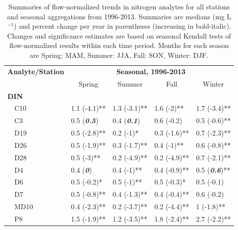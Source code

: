 \documentclass[journal = esthag, manuscript = article]{achemso}\usepackage[]{graphicx}\usepackage[]{color}
\begin{document}
\begin{suppinfo}
\begin{table}[!tbp]
\caption{Summaries of flow-normalized trends in nitrogen analytes for all stations and seasonal aggregations from 1996-2013. Summaries are  medians (mg L$^{-1}$) and percent change per year in parentheses (increasing in bold-italic). Changes and significance estimates are based on seasonal Kendall tests of flow-normalized results within each time period. Months for each season are Spring: MAM, Summer: JJA, Fall: SON, Winter: DJF.\label{tab:trndsaft}} 
\begin{center}
\begin{tabular}{lllll}
\hline\hline
\multicolumn{1}{l}{\bfseries Analyte/Station}&\multicolumn{4}{c}{\bfseries Seasonal, 1996-2013}\tabularnewline
\cline{2-5}
\multicolumn{1}{l}{}&\multicolumn{1}{c}{Spring}&\multicolumn{1}{c}{Summer}&\multicolumn{1}{c}{Fall}&\multicolumn{1}{c}{Winter}\tabularnewline
\hline
{\bfseries DIN}&&&&\tabularnewline
~~C10&1.1 \footnotesize{(-4.1)**}&1.3 \footnotesize{(-3.1)**}&1.6 \footnotesize{(-2)**}&1.7 \footnotesize{(-3.4)**}\tabularnewline
~~C3&0.5 \footnotesize{(\textit{\textbf{0.5}})}&0.4 \footnotesize{(\textit{\textbf{0.1}})}&0.6 \footnotesize{(-0.2)}&0.5 \footnotesize{(-0.6)**}\tabularnewline
~~D19&0.5 \footnotesize{(-2.8)**}&0.2 \footnotesize{(-1)*}&0.3 \footnotesize{(-1.6)**}&0.7 \footnotesize{(-2.3)**}\tabularnewline
~~D26&0.5 \footnotesize{(-1.9)**}&0.3 \footnotesize{(-1.7)**}&0.4 \footnotesize{(-1)**}&0.6 \footnotesize{(-0.8)**}\tabularnewline
~~D28&0.5 \footnotesize{(-3)**}&0.2 \footnotesize{(-4.9)**}&0.2 \footnotesize{(-4.9)**}&0.7 \footnotesize{(-2.1)**}\tabularnewline
~~D4&0.4 \footnotesize{(\textit{\textbf{0}})}&0.4 \footnotesize{(-1)**}&0.4 \footnotesize{(-0.9)**}&0.5 \footnotesize{(\textit{\textbf{0.6}})**}\tabularnewline
~~D6&0.5 \footnotesize{(-0.2)*}&0.5 \footnotesize{(-1)**}&0.5 \footnotesize{(-0.3)*}&0.5 \footnotesize{(-0.1)}\tabularnewline
~~D7&0.5 \footnotesize{(-0.8)**}&0.4 \footnotesize{(-1.3)**}&0.4 \footnotesize{(-0.4)**}&0.6 \footnotesize{(-0.2)}\tabularnewline
~~MD10&0.4 \footnotesize{(-2.3)**}&0.2 \footnotesize{(-3.7)**}&0.2 \footnotesize{(-4.4)**}&1 \footnotesize{(-1.8)**}\tabularnewline
~~P8&1.5 \footnotesize{(-1.9)**}&1.2 \footnotesize{(-3.5)**}&1.8 \footnotesize{(-2.4)**}&2.7 \footnotesize{(-2.2)**}\tabularnewline

\end{tabular}
\end{center}
\end{table}
\end{suppinfo}
\end{document}
